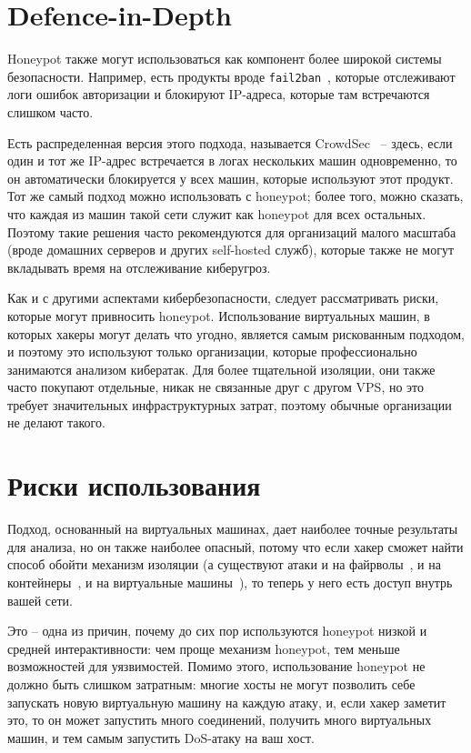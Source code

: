 \documentclass[a4page]{article}
\begin{document}
\section{Defence-in-Depth}

Honeypot также могут использоваться как компонент более широкой системы безопасности. Например, есть продукты вроде \texttt{fail2ban}~\cite{fail2ban}, которые отслеживают логи ошибок авторизации и блокируют IP-адреса, которые там встречаются слишком часто.

Есть распределенная версия этого подхода, называется CrowdSec~\cite{crowdsec} -- здесь, если один и тот же IP-адрес встречается в логах нескольких машин одновременно, то он автоматически блокируется у всех машин, которые используют этот продукт. Тот же самый подход можно использовать с honeypot; более того, можно сказать, что каждая из машин такой сети служит как honeypot для всех остальных. Поэтому такие решения часто рекомендуются для организаций малого масштаба (вроде домашних серверов и других self-hosted служб), которые также не могут вкладывать время на отслеживание киберугроз.

Как и с другими аспектами кибербезопасности, следует рассматривать риски, которые могут привносить honeypot. Использование виртуальных машин, в которых хакеры могут делать что угодно, является самым рискованным подходом, и поэтому это используют только организации, которые профессионально занимаются анализом кибератак. Для более тщательной изоляции, они также часто покупают отдельные, никак не связанные друг с другом VPS, но это требует значительных инфраструктурных затрат, поэтому обычные организации не делают такого.

\section{Риски использования}

Подход, основанный на виртуальных машинах, дает наиболее точные результаты для анализа, но он также наиболее опасный, потому что если хакер сможет найти способ обойти механизм изоляции (а существуют атаки и на файрволы~\cite{firewall-vulns}, и на контейнеры~\cite{container-vulns}, и на виртуальные машины~\cite{vm-vulns}), то теперь у него есть доступ внутрь вашей сети.

Это – одна из причин, почему до сих пор используются honeypot низкой и средней интерактивности: чем проще механизм honeypot, тем меньше возможностей для уязвимостей. Помимо этого, использование honeypot не должно быть слишком затратным: многие хосты не могут позволить себе запускать новую виртуальную машину на каждую атаку, и, если хакер заметит это, то он может запустить много соединений, получить много виртуальных машин, и тем самым запустить DoS-атаку на ваш хост.
\end{document}
